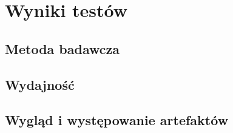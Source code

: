 \chapter{Wyniki testów}
\label{t:wyniki}

	\section{Metoda badawcza}
	\label{t:wyniki:metoda}
	
	\section{Wydajność}
	\label{t:wyniki:wydajnosc}
	
	\section{Wygląd i występowanie artefaktów}
	\label{t:wyniki:artefakty}